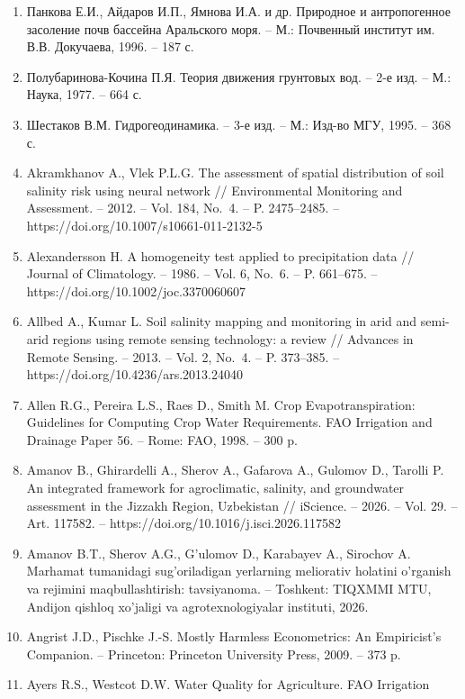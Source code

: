 \begin{enumerate}
  Мирцхулава Ц.Е. О надёжности крупных каналов. -- М.: Колос, 1981. --
  318 с.
\item
  Панкова Е.И., Айдаров И.П., Ямнова И.А. и др. Природное и
  антропогенное засоление почв бассейна Аральского моря. -- М.:
  Почвенный институт им. В.В. Докучаева, 1996. -- 187 с.
\item
  Полубаринова-Кочина П.Я. Теория движения грунтовых вод. -- 2-е изд. --
  М.: Наука, 1977. -- 664 с.
\item
  Шестаков В.М. Гидрогеодинамика. -- 3-е изд. -- М.: Изд-во МГУ, 1995.
  -- 368 с.
\item
  Akramkhanov A., Vlek P.L.G. The assessment of spatial distribution of
  soil salinity risk using neural network // Environmental Monitoring
  and Assessment. -- 2012. -- Vol. 184, No.~4. -- P. 2475--2485. --
  https://doi.org/10.1007/s10661-011-2132-5
\item
  Alexandersson H. A homogeneity test applied to precipitation data //
  Journal of Climatology. -- 1986. -- Vol. 6, No.~6. -- P. 661--675. --
  https://doi.org/10.1002/joc.3370060607
\item
  Allbed A., Kumar L. Soil salinity mapping and monitoring in arid and
  semi-arid regions using remote sensing technology: a review //
  Advances in Remote Sensing. -- 2013. -- Vol. 2, No.~4. -- P. 373--385.
  -- https://doi.org/10.4236/ars.2013.24040
\item
  Allen R.G., Pereira L.S., Raes D., Smith M. Crop Evapotranspiration:
  Guidelines for Computing Crop Water Requirements. FAO Irrigation and
  Drainage Paper 56. -- Rome: FAO, 1998. -- 300 p.
\item
  Amanov B., Ghirardelli A., Sherov A., Gafarova A., Gulomov D., Tarolli
  P. An integrated framework for agroclimatic, salinity, and groundwater
  assessment in the Jizzakh Region, Uzbekistan // iScience. -- 2026. --
  Vol. 29. -- Art. 117582. -- https://doi.org/10.1016/j.isci.2026.117582
\item
  Amanov B.T., Sherov A.G., G'ulomov D., Karabayev A., Sirochov A.
  Marhamat tumanidagi sug'oriladigan yerlarning meliorativ holatini
  o'rganish va rejimini maqbullashtirish: tavsiyanoma. -- Toshkent:
  TIQXMMI MTU, Andijon qishloq xo'jaligi va agrotexnologiyalar
  instituti, 2026.
\item
  Angrist J.D., Pischke J.-S. Mostly Harmless Econometrics: An
  Empiricist's Companion. -- Princeton: Princeton University Press,
  2009. -- 373 p.
\item
  Ayers R.S., Westcot D.W. Water Quality for Agriculture. FAO Irrigation

\end{enumerate}
